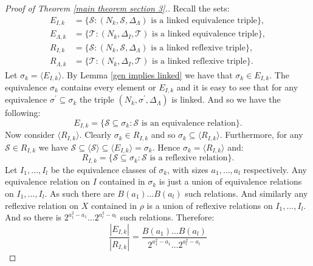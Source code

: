 \documentclass[a4paper, 12pt,reqno]{amsart}
\theoremstyle{plain}
\theoremstyle{definition}
\theoremstyle{remark}
\begin{document}
\begin{proof}[Proof of Theorem \ref{main theorem section 3}.]
    Recall the sets:
    \begin{align*}
    E_{I,k} &= \{ \mathcal{S} : (N_k,\mathcal{S},\Delta_\Lambda) \text{ is a linked equivalence triple} \}, \\
    E_{\Lambda,k} &= \{ \mathcal{T} : (N_k,\Delta_I,\mathcal{T}) \text{ is a linked equivalence triple} \}, \\
    R_{I,k} &= \{ \mathcal{S} : (N_k,\mathcal{S},\Delta_\Lambda) \text{ is a linked reflexive triple} \}, \\
    R_{\Lambda,k} &= \{ \mathcal{T} : (N_k,\Delta_I,\mathcal{T}) \text{ is a linked reflexive triple} \}.
    \end{align*}
    Let $\sigma_k = \langle E_{I,k} \rangle$. By Lemma \ref{gen implies linked} we have that $\sigma_k \in E_{I,k}$.
    The equivalence $\sigma_k$ contains every element or $E_{I,k}$ and it is easy to see that for any equivalence $\sigma^\prime \subseteq \sigma_k$ the triple $(N_k,\sigma^\prime,\Delta_\Lambda)$ is linked. 
    And so we have the following:
    \begin{equation*}
        E_{I,k} = \{ \mathcal{S} \subseteq \sigma_k : \mathcal{S} \text{ is an equivalence relation} \}.
    \end{equation*}
    Now consider $\langle R_{I,k} \rangle$. Clearly $\sigma_k \in R_{I,k}$ and so $\sigma_k \subseteq \langle R_{I,k} \rangle$.
    Furthermore, for any $\mathcal{S} \in R_{I,k}$ we have $\mathcal{S} \subseteq \langle \mathcal{S} \rangle \subseteq \langle E_{I,k} \rangle = \sigma_k$.
    Hence $\sigma_k = \langle R_{I,k} \rangle$ and:
    \begin{equation*}
        R_{I,k} = \{\mathcal{S} \subseteq \sigma_k : \mathcal{S} \text{ is a reflexive relation} \}.
    \end{equation*}
    Let $I_1 , \dots , I_l$ be the equivalence classes of $\sigma_k$, with sizes $a_1 ,\ldots ,a_l$ respectively.
    Any equivalence relation on $I$ contained in $\sigma_k$ is just a union of equivalence relations on $I_1 , \dots ,I_l$.
    As such there are $B(a_1) \dots B(a_l)$ such relations.
    And similarly any reflexive relation on $X$ contained in $\rho$ is a union of reflexive relations on $I_1 , \dots , I_l$.
    And so there is $2^{a_1^2 - a_1} \dots 2^{a_l^2 - a_l}$ such relations.
    Therefore:
    \begin{equation}
        \label{I fraction form}
        \frac{|E_{I,k}|}{|R_{I,k}|} = \frac{B(a_1) \dots B(a_l)}{2^{a_1^2 - a_1} \dots 2^{a_l^2 - a_l}}

\end{equation}
\end{proof}
\end{document}
